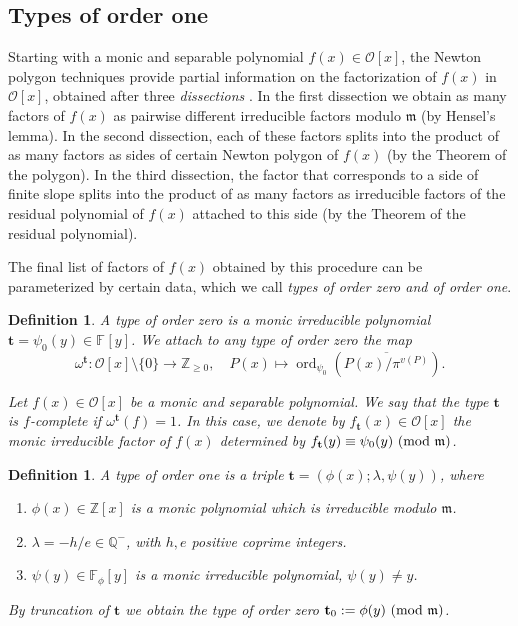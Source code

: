 \documentclass{amsart}
\newtheorem{definition}[theorem]{Definition}
\newcommand{\Z}{\mathbb Z}
\newcommand{\Q}{\mathbb Q}
\def\op{\operatorname}
\def\ff#1{\mathbb{F}_{#1}}
\def\fph{\mathbb{F}_{\phi}}
\def\la{\lambda}
\def\lra{\longrightarrow}
\def\m{{\mathfrak m}}
\def\md#1{\ \mbox{\rm(mod }{#1})}
\def\om{\omega}
\def\oo{{\mathcal O}}
\def\ord{\op{ord}}
\def\ty{\mathbf{t}}
\def\zpx{\oo[x]}
\begin{document}
\subsection{Types of order one}\label{orderone}
Starting with a monic and separable polynomial $f(x)\in\zpx$, the Newton polygon techniques provide partial information on the factorization of $f(x)$ in $\zpx$, obtained after three \emph{dissections} \cite{ber}. In the first dissection we obtain as many factors of $f(x)$ as pairwise different irreducible factors modulo $\m$ (by Hensel's lemma). In the second dissection, each of these factors splits into the product of as many factors as sides of certain Newton polygon of $f(x)$ (by the Theorem of the polygon). In the third dissection, the factor that corresponds to a side of finite slope splits into the product of as many factors as irreducible factors of the residual polynomial of $f(x)$ attached to this side (by the Theorem of the residual polynomial).

The final list of factors of $f(x)$ obtained by this procedure can be parameterized by certain data, which we call \emph{types of order zero and of order one}. 

\begin{definition}
A type of order zero is a monic irreducible polynomial $\ty=\psi_0(y)\in\ff{}[y]$. We attach to any type of order zero the map
$$
\om^\ty\colon \zpx\setminus\{0\}\lra \Z_{\ge 0},\quad P(x)\mapsto \ord_{\psi_0}(\overline{P(x)/\pi^{v(P)}}).
$$ 

Let $f(x)\in\zpx$ be a monic and separable polynomial. We say that the type $\ty$ is $f$-complete if $\om^\ty(f)=1$. In this case, we denote by $f_\ty(x)\in\zpx$ the monic irreducible factor of $f(x)$ determined by $f_\ty(y)\equiv \psi_0(y) \md{\m}$.
\end{definition}

\begin{definition}
A type of order one is a triple $\ty=(\phi(x);\la,\psi(y))$, where 
\begin{enumerate}
 \item $\phi(x)\in\Z[x]$ is a monic polynomial which is irreducible modulo $\m$.
\item  $\la=-h/e\in\Q^-$, with $h,e$ positive coprime integers.
\item  $\psi(y)\in \fph[y]$ is a monic irreducible polynomial, $\psi(y)\ne y$.
\end{enumerate}
By truncation of $\ty$ we obtain the type of order zero $\ty_0:=\phi(y)\md{\m}$.
\end{definition}
\end{document}
